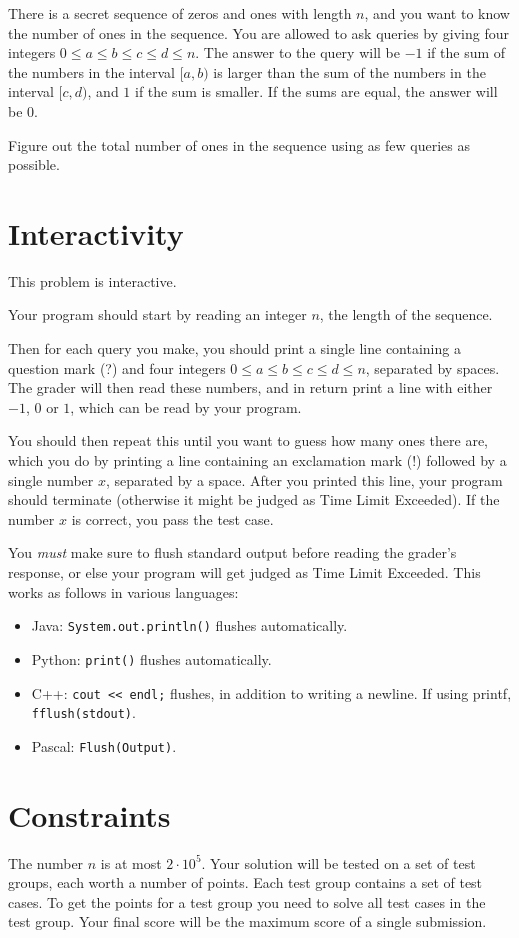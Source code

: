 There is a secret sequence of zeros and ones with length $n$, and you want to know the number of ones in the sequence.
You are allowed to ask queries by giving four integers $0 \leq a \leq b \leq c \leq d \leq n$. The answer
to the query will be $-1$ if the sum of the numbers in the interval $[a,b)$ is larger than the sum of the numbers
in the interval $[c,d)$, and $1$ if the sum is smaller. If the sums are equal, the answer will be $0$.

Figure out the total number of ones in the sequence using as few queries as possible.

\section*{Interactivity}
This problem is interactive.

Your program should start by reading an integer $n$, the length of the sequence.

Then for each query you make, you should print a single line containing a question mark (?) and
four integers $0 \leq a \leq b \leq c \leq d \leq n$, separated by spaces.
The grader will then read these numbers, and in return print a line with either $-1$, $0$ or $1$, which can be read by your program.

You should then repeat this until you want to guess how many ones there are,
which you do by printing a line containing an exclamation mark (!) followed by a single number $x$, separated by a space.
After you printed this line, your program should terminate (otherwise it might be judged as Time Limit Exceeded).
If the number $x$ is correct, you pass the test case.

You \emph{must} make sure to flush standard output before reading the grader's response, or else your program
will get judged as Time Limit Exceeded. This works as follows in various languages:
\begin{itemize}
  \item Java: \texttt{System.out.println()} flushes automatically.
  \item Python: \texttt{print()} flushes automatically.
  \item C++: \texttt{cout << endl;} flushes, in addition to writing a newline. If using printf, \texttt{fflush(stdout)}.
  \item Pascal: \texttt{Flush(Output)}.
\end{itemize}

\section*{Constraints}
The number $n$ is at most $2 \cdot 10^5$.
Your solution will be tested on a set of test groups, each worth a number of points.
Each test group contains a set of test cases.
To get the points for a test group you need to solve all test cases in the test group.
Your final score will be the maximum score of a single submission.

